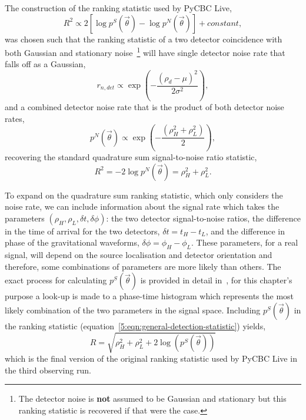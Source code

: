 The construction of the ranking statistic used by PyCBC Live,
%
\begin{equation}
    R^{2} \propto 2 [\log p^{S}(\Vec{\theta}) - \log p^{N}(\Vec{\theta})] + constant,
    \label{5:eqn:general-detection-statistic}
\end{equation}
%
was chosen such that the ranking statistic of a two detector coincidence with both Gaussian and stationary noise~\footnote{The detector noise is \textbf{not} assumed to be Gaussian and stationary but this ranking statistic is recovered if that were the case.} will have single detector noise rate that falls off as a Gaussian,
%
\begin{equation}
    r_{n,det} \propto \exp \left( -\frac{(\rho_d - \mu)^2}{2 \sigma^2} \right),
    \label{5:eqn:old-noise-rate}
\end{equation}
%
and a combined detector noise rate that is the product of both detector noise rates,
%
\begin{equation}
    p^{N}(\Vec{\theta}) \propto \exp \left( -\frac{(\rho_{H}^{2} + \rho_{L}^{2})}{2} \right),
    \label{5:eqn:old-comb-noise-rate}
\end{equation}
%
recovering the standard quadrature sum signal-to-noise ratio statistic,
%
\begin{equation}
    R^{2} = -2 \log p^{N}(\Vec{\theta}) = \rho^{2}_{H} + \rho^{2}_{L} .
\end{equation}

To expand on the quadrature sum ranking statistic, which only considers the noise rate, we can include information about the signal rate which takes the parameters $(\rho_{H}, \rho_{L}, \delta t, \delta \phi)$: the two detector signal-to-noise ratios, the difference in the time of arrival for the two detectors, $\delta t = t_{H} - t_{L}$, and the difference in phase of the gravitational waveforms, $\delta \phi = \phi_{H} - \phi_{L}$. These parameters, for a real signal, will depend on the source localisation and detector orientation and therefore, some combinations of parameters are more likely than others. The exact process for calculating $p^{S}(\Vec{\theta})$ is provided in detail in~\cite{PyCBC:2017}, for this chapter's purpose a look-up is made to a phase-time histogram which represents the most likely combination of the two parameters in the signal space. Including $p^{S}(\Vec{\theta})$ in the ranking statistic (equation~\ref{5:eqn:general-detection-statistic}) yields,
%
\begin{equation}
    R = \sqrt{\rho^{2}_{H} + \rho^{2}_{L} + 2 \log\left(p^{S}(\Vec{\theta})\right)}
    \label{5:eqn:original-statistic}
\end{equation}
%
which is the final version of the original ranking statistic used by PyCBC Live in the third observing run.

